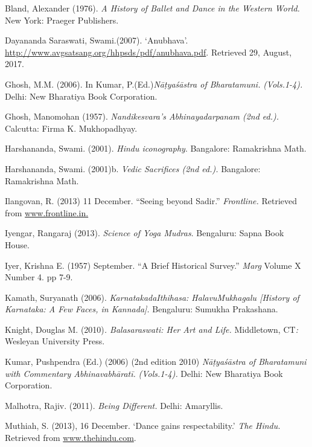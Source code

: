 \begin{thebibliography}{99}
 Bland, Alexander (1976). \textit{A History of Ballet and Dance in the Western World.} New York: Praeger Publishers.

  Dayananda Saraswati, Swami.(2007). ‘Anubhava’. \url{http://www.avgsatsang.org/hhpsds/pdf/anubhava.pdf}. Retrieved 29, August, 2017.

  Ghosh, M.M. (2006). In Kumar, P.(Ed.)\textit{Nāṭyaśāstra of Bharatamuni.} \textit{(Vols.1-4).} Delhi: New Bharatiya Book Corporation.

  Ghosh, Manomohan (1957). \textit{Nandikesvara’s Abhinayadarpanam (2nd ed.).} Calcutta: Firma K. Mukhopadhyay.

  Harshananda, Swami. (2001). \textit{Hindu iconography}. Bangalore: Ramakrishna Math.

  Harshananda, Swami. (2001)b.\textit{ Vedic Sacrifices (2nd ed.).} Bangalore: Ramakrishna Math.

  Ilangovan, R. (2013) 11 December. “Seeing beyond Sadir.” \textit{Frontline.} Retrieved from \url{www.frontline.in.}

  Iyengar, Rangaraj (2013). \textit{Science of Yoga Mudras}. Bengaluru: Sapna Book House.

  Iyer, Krishna E. (1957) September. “A Brief Historical Survey.”\textit{ Marg} Volume X Number 4. pp 7-9.

  Kamath, Suryanath (2006). \textit{KarnatakadaIthihasa: HalavuMukhagalu [History of Karnataka: A Few Faces, in Kannada]. }Bengaluru: Sumukha Prakashana.

  Knight, Douglas M. (2010)\textit{. Balasaraswati: Her Art and Life. }Middletown, CT\textit{: }Wesleyan University Press.

  Kumar, Pushpendra (Ed.) (2006) (2nd edition 2010) \textit{Nāṭyaśāstra of Bharatamuni with Commentary Abhinavabhāratī.} \textit{(Vols.1-4).} Delhi: New Bharatiya Book Corporation.

  Malhotra, Rajiv. (2011). \textit{Being Different.} Delhi: Amaryllis.

  Muthiah, S. (2013), 16 December. ‘Dance gains respectability.’ \textit{The Hindu.} Retrieved from \url{www.thehindu.com}.


\end{thebibliography}
